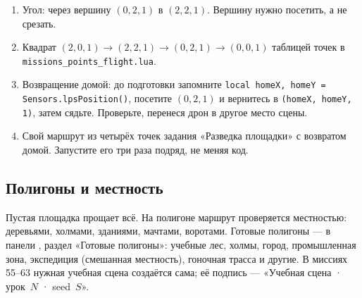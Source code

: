 \begin{taskbox}
\begin{enumerate}
  \item Угол: через вершину $(0, 2, 1)$ в $(2, 2, 1)$. Вершину нужно посетить, а не срезать.
  \item Квадрат $(2, 0, 1) \to (2, 2, 1) \to (0, 2, 1) \to (0, 0, 1)$ таблицей точек в \texttt{missions\_points\_flight.lua}.
  \item Возвращение домой: до подготовки запомните \verb|local homeX, homeY = Sensors.lpsPosition()|, посетите $(0, 2, 1)$ и вернитесь в \verb|(homeX, homeY, 1)|, затем сядьте. Проверьте, перенеся дрон в другое место сцены.
  \item Свой маршрут из четырёх точек задания «Разведка площадки» с возвратом домой. Запустите его три раза подряд, не меняя код.
\end{enumerate}
\end{taskbox}

\subsection{Полигоны и местность}

Пустая площадка прощает всё. На полигоне маршрут проверяется местностью: деревьями, холмами, зданиями, мачтами, воротами. Готовые полигоны --- в панели , раздел «Готовые полигоны»: учебные лес, холмы, город, промышленная зона, экспедиция (смешанная местность), гоночная трасса и другие. В миссиях 55--63 нужная учебная сцена создаётся сама; её подпись --- «Учебная сцена · урок~$N$ · seed~$S$».

